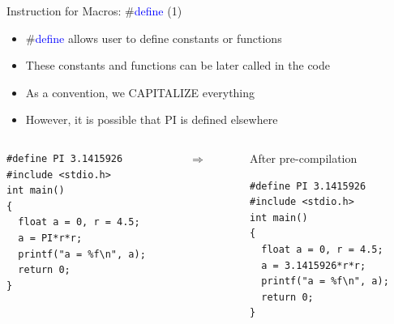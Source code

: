 \begin{frame}[fragile]{Instruction for Macros: \#\textcolor{blue}{define} (1)}
\begin{itemize}
	\item {\#\textcolor{blue}{define} allows user to define constants or functions}
	\item {These constants and functions can be later called in the code}
	\item {As a convention, we CAPITALIZE everything}
	\item {However, it is possible that PI is defined elsewhere}
\end{itemize}

\begin{columns}
\begin{column}{0.44\linewidth}
\begin{lstlisting}[xleftmargin=0.02\linewidth]
#define PI 3.1415926
#include <stdio.h>
int main()
{
  float a = 0, r = 4.5;
  a = PI*r*r;
  printf("a = %f\n", a);
  return 0;
}
\end{lstlisting}
\end{column}
\begin{column}{0.14\linewidth}
\begin{center}
\vspace{0.6in}
$\Longrightarrow$
\end{center}
\end{column}
\begin{column}{0.41\linewidth}
\begin{block}{After pre-compilation}
\end{block}
\begin{lstlisting}
#define PI 3.1415926
#include <stdio.h>
int main()
{
  float a = 0, r = 4.5;
  a = 3.1415926*r*r;
  printf("a = %f\n", a);
  return 0;
}
\end{lstlisting}
\end{column}
\end{columns}
\end{frame}

